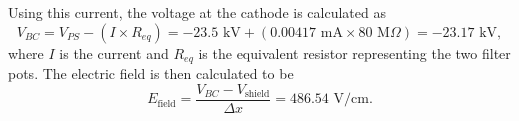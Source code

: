 Using this current, the voltage at the cathode is calculated as
\begin{equation} \label{eq:VBC}
V_{BC}=V_{PS} - (I \times R_{eq}) = -23.5\text{ kV} + ( 0.00417\text{ mA} \times 80\text{ M}\Omega ) = -23.17\text{ kV}, 
\end{equation}
where $I$ is the current and $R_{eq}$ is the equivalent resistor representing the two filter pots. The electric field is then calculated to be
\begin{equation}E_{\text{field}} = \frac{V_{BC} - V_{\text{shield}}}{\Delta x} = 486.54\text{ V/cm}.
\end{equation}




